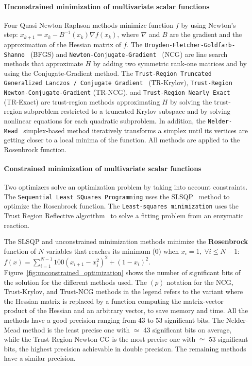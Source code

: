 \documentclass[10pt,journal,compsoc]{IEEEtran}
\begin{document}
\paragraph{Unconstrained minimization of multivariate scalar functions}
Four Quasi-Newton-Raphson methods minimize function $f$ by using Newton's step:
$x_{k+1} = x_{k} - B^{-1}(x_k)\nabla f(x_k)$, where $\nabla$ and $B$ are the
gradient and the approximation of the Hessian matrix of $f$. The
\texttt{Broyden-Fletcher-Goldfarb-Shanno}~\cite{BFGS} (BFGS) and
\texttt{Newton-Conjugate-Gradient}~\cite{nocedal2006numerical} (NCG) are line
search methods that approximate $H$ by adding two symmetric rank-one matrices
and by using the Conjugate-Gradient method. The \texttt{Trust-Region Truncated
    Generalized Lanczos / Conjugate Gradient}~\cite{gould1999solving} (TR-Krylov),
\texttt{Trust-Region Newton-Conjugate-Gradient} (TR-NCG), and
\texttt{Trust-Region Nearly Exact}~\cite{nocedal2006numerical} (TR-Exact) are
trust-region methods approximating $H$ by solving the trust-region subproblem
restricted to a truncated Krylov subspace and by solving nonlinear equations for
each quadratic subproblem. In addition, the
\texttt{Nelder-Mead}~\cite{singer2009nelder} simplex-based method iteratively
transforms a simplex until its vertices are getting closer to a local minima of
the function. All methods are applied to the Rosenbrock function.

\paragraph{Constrained minimization of multivariate scalar functions}
Two optimizers solve an optimization problem by taking into account constraints.
The \texttt{Sequential Least SQuares Programming} uses the
SLSQP~\cite{kraft1988software} method to optimize the Rosenbrock function. The
\texttt{Least-squares minimization} uses the Trust Region Reflective
algorithm~\cite{li1993centering} to solve a fitting problem from an enzymatic
reaction.

The SLSQP and unconstrained minimization methods minimize the
\textbf{Rosenbrock} function of $N$ variables that reaches its minimum (0) when
$x_i=1,\; \forall i \leq N-1$:
$f(x) = \sum_{i=1}^{N-1} 100(x_{i+1}-x^2_i)^2 + (1-x_i)^2$.
Figure~\ref{fig:unconstrained_optimization} shows the number of significant bits
of the solution for the different methods used. The $(p)$ notation for the NCG,
Trust-Krylov, and Trust-NCG methods in the legend refers to the variant where
the Hessian matrix is replaced by a function computing the matrix-vector product
of the Hessian and an arbitrary vector, to save memory and time. All the methods
have a good precision ranging from 43 to 53 significant bits. The Nelder-Mead
method is the least precise one with $\simeq$ 43 significant bits on average,
while the Trust-Region-Newton-CG is the most precise one with $\simeq$ 53
significant bits, the highest precision achievable in double precision. The
remaining methods have a similar precision. 
\end{document}
